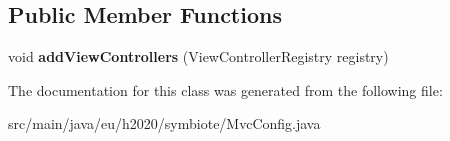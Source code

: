 \subsection*{Public Member Functions}
\begin{DoxyCompactItemize}
\item 
void {\bfseries add\+View\+Controllers} (View\+Controller\+Registry registry)\hypertarget{classeu_1_1h2020_1_1symbiote_1_1MvcConfig_a8ab502c0631464766b89de95f1c235f0}{}\label{classeu_1_1h2020_1_1symbiote_1_1MvcConfig_a8ab502c0631464766b89de95f1c235f0}

\end{DoxyCompactItemize}


The documentation for this class was generated from the following file\+:\begin{DoxyCompactItemize}
\item 
src/main/java/eu/h2020/symbiote/Mvc\+Config.\+java\end{DoxyCompactItemize}
